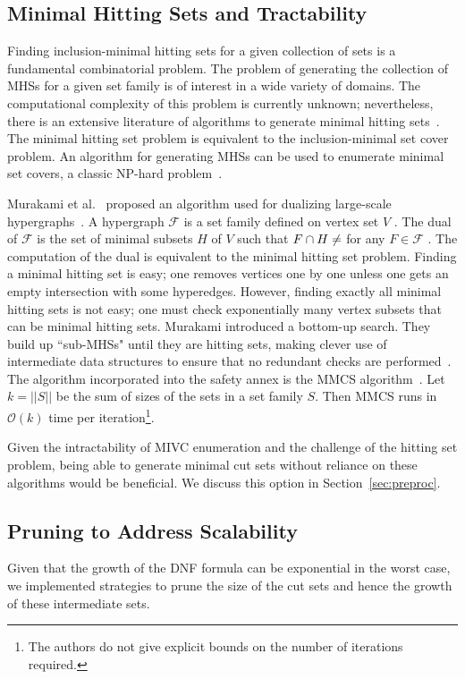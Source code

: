 \subsection{Minimal Hitting Sets and Tractability}
Finding inclusion-minimal hitting sets for a given collection of sets is a fundamental combinatorial problem. The problem of generating the collection of MHSs for a given set family is of interest in a wide variety of domains. The computational complexity of this problem is currently unknown; nevertheless, there is an extensive literature of algorithms to generate minimal hitting sets~\cite{gainer2017minimal}. The minimal hitting set problem is equivalent to the inclusion-minimal set cover problem. An algorithm for generating MHSs can be used to enumerate minimal set covers, a classic NP-hard problem~\cite{karp1972reducibility}. 

Murakami et al.~ proposed an algorithm used for dualizing large-scale hypergraphs~\cite{murakami2013efficient}. A hypergraph $\mathcal{F}$ is a set family defined on vertex set $V$ . The dual of $\mathcal{F}$ is the set of minimal subsets $H$ of $V$ such that $F \cap H \not = \empty$ for any $F \in \mathcal{F}$ . The computation of the dual is equivalent to the minimal hitting set problem. Finding a minimal hitting set is easy; one removes vertices one by one unless one gets an empty intersection with some hyperedges. However, finding exactly all minimal hitting sets is not easy; one must check exponentially many vertex subsets that can be minimal hitting sets. Murakami introduced a bottom-up search. They build up ``sub-MHSs" until they are hitting sets, making clever use of intermediate data structures to ensure that no redundant checks are performed~\cite{gainer2017minimal}. The algorithm incorporated into the safety annex is the MMCS algorithm~\cite{murakami2013efficient}. Let $k = ||S||$ be the sum of sizes of the sets in a set family $S$. Then MMCS runs in $\mathcal{O}(k)$ time per iteration\footnote{The authors do not give explicit bounds on the number of iterations required.}.

Given the intractability of MIVC enumeration and the challenge of the hitting set problem, being able to generate minimal cut sets without reliance on these algorithms would be beneficial. We discuss this option in Section~\ref{sec:preproc}.


\subsection{Pruning to Address Scalability}
Given that the growth of the DNF formula can be exponential in the worst case, we implemented strategies to prune the size of the cut sets and hence the growth of these intermediate sets. 

